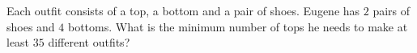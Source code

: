 Each outfit consists of a top, a bottom and a pair of shoes. Eugene has $2$ pairs of shoes and $4$ bottoms. What is the minimum number of tops he needs to make at least $35$ different outfits?
